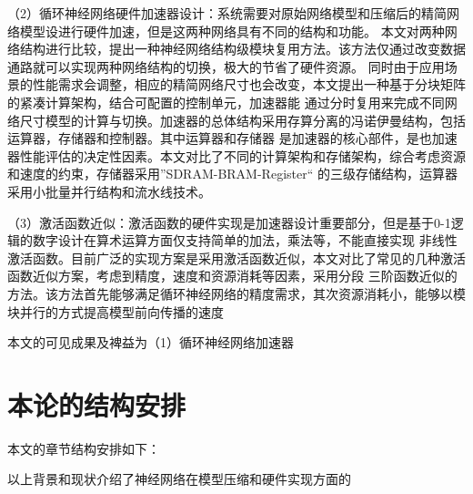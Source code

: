 （2）循环神经网络硬件加速器设计：系统需要对原始网络模型和压缩后的精简网络模型设进行硬件加速，但是这两种网络具有不同的结构和功能。
本文对两种网络结构进行比较，提出一种神经网络结构级模块复用方法。该方法仅通过改变数据通路就可以实现两种网络结构的切换，极大的节省了硬件资源。
同时由于应用场景的性能需求会调整，相应的精简网络尺寸也会改变，本文提出一种基于分块矩阵的紧凑计算架构，结合可配置的控制单元，加速器能
通过分时复用来完成不同网络尺寸模型的计算与切换。加速器的总体结构采用存算分离的冯诺伊曼结构，包括运算器，存储器和控制器。其中运算器和存储器
是加速器的核心部件，是也加速器性能评估的决定性因素。本文对比了不同的计算架构和存储架构，综合考虑资源和速度的约束，存储器采用”SDRAM-BRAM-Register“
的三级存储结构，运算器采用小批量并行结构和流水线技术。

（3）激活函数近似：激活函数的硬件实现是加速器设计重要部分，但是基于0-1逻辑的数字设计在算术运算方面仅支持简单的加法，乘法等，不能直接实现
非线性激活函数。目前广泛的实现方案是采用激活函数近似，本文对比了常见的几种激活函数近似方案，考虑到精度，速度和资源消耗等因素，采用分段
三阶函数近似的方法。该方法首先能够满足循环神经网络的精度需求，其次资源消耗小，能够以模块并行的方式提高模型前向传播的速度

本文的可见成果及裨益为（1）循环神经网络加速器

\section{本论的结构安排}
本文的章节结构安排如下：

以上背景和现状介绍了神经网络在模型压缩和硬件实现方面的 
